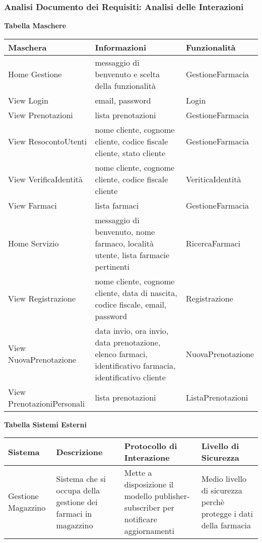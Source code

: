 \newpage

\subsubsection{Analisi Documento dei Requisiti: Analisi delle Interazioni}
\hfill \break

\textbf{Tabella Maschere}
\hfill \break

\begin{tabular} {|P{5cm}|P{7cm}|P{4cm}|}
    \hline
    \textbf{Maschera} & \textbf{Informazioni} & \textbf{Funzionalità} \\
    \hline
    Home Gestione & messaggio di benvenuto e scelta della funzionalità & GestioneFarmacia \\
    \hline
    View Login & email, password & Login \\
    \hline
    View Prenotazioni & lista prenotazioni & GestioneFarmacia \\
    \hline
    View ResocontoUtenti & nome cliente, cognome cliente, codice fiscale cliente, stato cliente & GestioneFarmacia \\
    \hline
    View VerificaIdentità & nome cliente, cognome cliente, codice fiscale cliente  & VeriticaIdentità \\
    \hline
    View Farmaci & lista farmaci & GestioneFarmacia \\
    \hline
    Home Servizio & messaggio di benvenuto, nome farmaco, località utente, lista farmacie pertinenti & RicercaFarmaci \\
    \hline
    View Registrazione &  nome cliente, cognome cliente, data di nascita, codice fiscale, email, password  & Registrazione \\
    \hline
    View NuovaPrenotazione & data invio, ora invio, data prenotazione, elenco farmaci, identificativo farmacia, identificativo cliente & NuovaPrenotazione \\
    \hline
    View PrenotazioniPersonali & lista prenotazioni & ListaPrenotazioni \\
    \hline
\end{tabular}
\hfill \break
\hfill \break

\textbf{Tabella Sistemi Esterni}
\hfill \break

\begin{tabular} {|P{2.5cm}|P{4cm}|P{4cm}|P{4.5cm}|}
    \hline
    \textbf{Sistema} & \textbf{Descrizione} & \textbf{Protocollo di Interazione} & \textbf{Livello di Sicurezza} \\
    \hline
    Gestione \linebreak Magazzino  &  Sistema che si occupa della gestione dei farmaci in magazzino  & Mette a disposizione il modello publisher-subscriber per notificare aggiornamenti & Medio livello di sicurezza perchè protegge i dati della farmacia  \\
    \hline
\end{tabular}
\hfill \break

